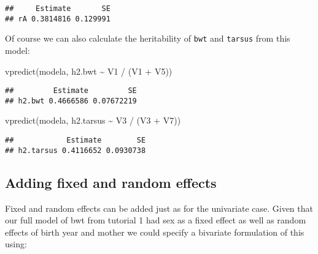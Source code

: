 \documentclass[
  12pt,
]{book}
\newenvironment{Shaded}{\begin{snugshade}}{\end{snugshade}}
\newcommand{\FunctionTok}[1]{\textcolor[rgb]{0.00,0.00,0.00}{#1}}
\newcommand{\NormalTok}[1]{#1}
\newcommand{\SpecialCharTok}[1]{\textcolor[rgb]{0.00,0.00,0.00}{#1}}
\begin{document}
\begin{verbatim}
##     Estimate       SE
## rA 0.3814816 0.129991
\end{verbatim}

Of course we can also calculate the heritability of \texttt{bwt} and \texttt{tarsus} from this model:

\begin{Shaded}
\begin{Highlighting}[]
\FunctionTok{vpredict}\NormalTok{(modela, h2.bwt }\SpecialCharTok{\textasciitilde{}}\NormalTok{ V1 }\SpecialCharTok{/}\NormalTok{ (V1 }\SpecialCharTok{+}\NormalTok{ V5))}
\end{Highlighting}
\end{Shaded}

\begin{verbatim}
##         Estimate         SE
## h2.bwt 0.4666586 0.07672219
\end{verbatim}

\begin{Shaded}
\begin{Highlighting}[]
\FunctionTok{vpredict}\NormalTok{(modela, h2.tarsus }\SpecialCharTok{\textasciitilde{}}\NormalTok{ V3 }\SpecialCharTok{/}\NormalTok{ (V3 }\SpecialCharTok{+}\NormalTok{ V7))}
\end{Highlighting}
\end{Shaded}

\begin{verbatim}
##            Estimate        SE
## h2.tarsus 0.4116652 0.0930738
\end{verbatim}

\hypertarget{adding-fixed-and-random-effects}{%
\subsection{Adding fixed and random effects}\label{adding-fixed-and-random-effects}}

Fixed and random effects can be added just as for the univariate case. Given that our full model of bwt from tutorial 1 had sex as a fixed effect as well as random effects of birth year and mother we could specify a bivariate formulation of this using:
\end{document}
